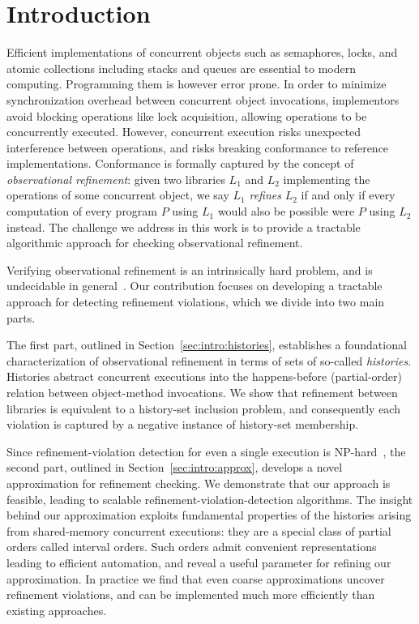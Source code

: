 \section{Introduction}

Efficient implementations of concurrent objects such as semaphores, locks, and
atomic collections including stacks and queues are essential to modern
computing. Programming them is however error prone. In order to minimize
synchronization overhead between concurrent object invocations, implementors
avoid blocking operations like lock acquisition, allowing operations to be
concurrently executed. However, concurrent execution risks unexpected
interference between operations, and risks breaking conformance to reference
implementations. Conformance is formally captured by the concept of
\emph{observational refinement}: given two libraries $L_1$ and $L_2$
implementing the operations of some concurrent object, we say $L_1$
\emph{refines} $L_2$ if and only if every computation of every program $P$
using $L_1$ would also be possible were $P$ using $L_2$ instead. The challenge
we address in this work is to provide a tractable algorithmic approach for
checking observational refinement.

Verifying observational refinement is an intrinsically hard problem, and is
undecidable in general~\cite{conf/esop/BouajjaniEEH13}. Our contribution
focuses on developing a tractable approach for detecting refinement violations,
which we divide into two main parts.

The first part, outlined in Section~\ref{sec:intro:histories}, establishes a
foundational characterization of observational refinement in terms of sets of
so-called \emph{histories}. Histories abstract concurrent executions into the
happens-before (partial-order) relation between object-method invocations. We
show that refinement between libraries is equivalent to a history-set inclusion
problem, and consequently each violation is captured by a negative instance of
history-set membership.

Since refinement-violation detection for even a single execution is
NP-hard~\cite{journals/siamcomp/GibbonsK97}, the second part, outlined in
Section~\ref{sec:intro:approx}, develops a novel approximation for refinement
checking. We demonstrate that our approach is feasible, leading to scalable
refinement-violation-detection algorithms. The insight behind our approximation
exploits fundamental properties of the histories arising from shared-memory
concurrent executions: they are a special class of partial orders called
interval orders. Such orders admit convenient representations leading to
efficient automation, and reveal a useful parameter for refining our
approximation. In practice we find that even coarse approximations uncover
refinement violations, and can be implemented much more efficiently than
existing approaches.


